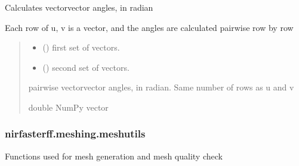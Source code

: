 \documentclass[letterpaper,10pt,english]{sphinxmanual}
\begin{document}
\begin{fulllineitems}
\label{\detokenize{_autosummary/nirfasterff.meshing.auxiliary.vector_vector_angle:nirfasterff.meshing.auxiliary.vector_vector_angle}}
\pysigstartsignatures
\pysiglinewithargsret
{}
{\sphinxparamcomma {}}
{}
\pysigstopsignatures
\sphinxAtStartPar
Calculates vector\sphinxhyphen{}vector angles, in radian

\sphinxAtStartPar
Each row of u, v is a vector, and the angles are calculated pairwise row by row
\begin{quote}\begin{description}
\begin{itemize}
\item {} 
\sphinxAtStartPar
{} () \textendash{} first set of vectors.

\item {} 
\sphinxAtStartPar
{} () \textendash{} second set of vectors.

\end{itemize}

\sphinxAtStartPar
pairwise vector\sphinxhyphen{}vector angles, in radian. Same number of rows as u and v

\sphinxAtStartPar
double NumPy vector

\end{description}\end{quote}

\end{fulllineitems}


\sphinxstepscope


\subsubsection{nirfasterff.meshing.meshutils}
\label{\detokenize{_autosummary/nirfasterff.meshing.meshutils:module-nirfasterff.meshing.meshutils}}\label{\detokenize{_autosummary/nirfasterff.meshing.meshutils:nirfasterff-meshing-meshutils}}\label{\detokenize{_autosummary/nirfasterff.meshing.meshutils::doc}}
\sphinxAtStartPar
Functions used for mesh generation and mesh quality check
\end{document}
